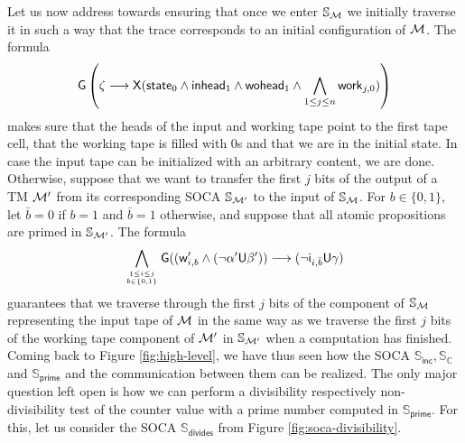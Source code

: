 \documentclass[times,envcountsame]{llncs}
\def\U{{\mathsf{U}}}
\def\X{{\mathsf{X}}}
\newcommand{\circuit}{\ensuremath{\mathbb{C}}}
\newcommand{\Soca}{\mathbb{S}}
\newcommand{\until}{\ensuremath{\U}}
\newcommand{\globally}{\ensuremath{\mathsf{G}}}
\begin{document}
Let us now address towards ensuring that once we enter $\Soca_\M$ we
initially traverse it in such a way that the trace corresponds to an
initial configuration of $\mathcal{M}$. The formula
\begin{align*}
  \globally\left(\zeta \longrightarrow \X(\state_0 \wedge \inh_1 \wedge
  \woh_1\wedge \bigwedge_{1\le j\le n}\mathsf{work}_{j,0} ) \right)
\end{align*}
makes sure that the heads of the input and working tape point to the
first tape cell, that the working tape is filled with $0$s and that we
are in the initial state. In case the input tape can be initialized
with an arbitrary content, we are done. Otherwise, suppose that we
want to transfer the first $j$ bits of the output of a TM $\mathcal{M}'$ from
its corresponding SOCA $\Soca_{\M'}$ to the input of $\Soca_\M$.  For
$b\in \{0,1\}$, let $\bar{b}=0$ if $b=1$ and $\bar{b}=1$ otherwise,
and suppose that all atomic propositions are primed in $\Soca_{\M'}$.
The formula
\begin{align*}
  \bigwedge_{1\le i\le j\atop{b\in \{0,1\}}}
  \globally
   ((\mathsf{w}'_{i,b} \wedge (\neg \alpha' \until \beta'))
  \longrightarrow (\neg \mathsf{i}_{i,\bar{b}}\until \gamma)
\end{align*}
guarantees that we traverse through the first $j$ bits of the
component of $\Soca_\M$ representing the input tape of $\mathcal{M}$ in the
same way as we traverse the first $j$ bits of the working tape
component of $\mathcal{M}'$ in $\Soca_{\M'}$ when a computation has finished.
Coming back to Figure \ref{fig:high-level}, we have thus seen how the
SOCA $\Soca_{\mathsf{inc}}, \Soca_{\circuit}$ and
$\Soca_{\mathsf{prime}}$ and the communication between them can be
realized. The only major question left open is how we can perform a
divisibility respectively non-divisibility test of the counter value
with a prime number computed in $\Soca_{\mathsf{prime}}$. For this,
let us consider the SOCA $\Soca_{\mathsf{divides}}$ from Figure
\ref{fig:soca-divisibility}.
\end{document}
